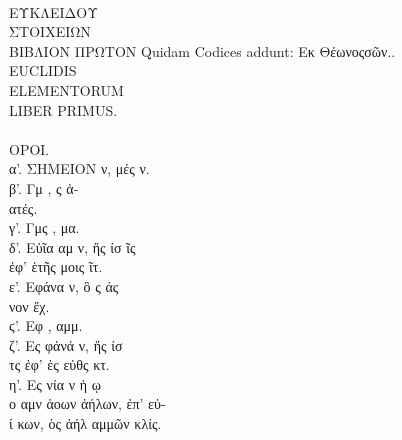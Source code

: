 \begin{typeLatin}
 \\
ΕΥΚΛΕΙΔΟΥ \\
ΣΤΟΙΧΕΙΩΝ \\
ΒΙΒΛΙΟΝ ΠΡΩΤΟΝ Quidam Codices addunt: Εκ  Θέωνος\lwr σῶν.. \\
EUCLIDIS \\
ELEMENTORUM \\
LIBER PRIMUS.\\
\\
ΟΡΟΙ.\\
α'. ΣΗΜΕΙΟΝ ν,  μές ν. \\
β'. Γμ , ς ἀ-  \\
ατές. \\
γ'. Γμς  , μα. \\
δ'. Εὐῖα αμ ν, ἥς ίσ ῖς  \\
ἐφ' ἑτῆς μοις ῖτ. \\
ε'. Εφάνα  ν, ὃ ς  άς  \\
νον ἔχ. \\
ϛ'. Εφ  , αμμ. \\
ζ'. Ες φάνά ν, ἥς ίσ  \\
τς ἐφ' ἑς εὐθς κτ. \\
η'. Ες  νία ν ἡ  ῳ  \\
ο αμν ἁοων ἀήλων,   ἐπ' εὐ-  \\
ί κων, ὸς ἀήλ  αμμῶν κλίς. \\

\end{typeLatin}
